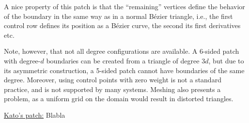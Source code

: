 \documentclass{article}
\begin{document}
A nice property of this patch is that the ``remaining'' vertices define the behavior of the
boundary in the same way as in a normal B\'ezier triangle, i.e., the first control row defines
its position as a B\'ezier curve, the second its first derivatives etc.

Note, however, that not all degree configurations are available. A 6-sided patch with degree-$d$
boundaries can be created from a triangle of degree $3d$, but due to its asymmetric construction,
a 5-sided patch cannot have boundaries of the same degree. Moreover, using control points with zero
weight is not a standard practice, and is not supported by many systems. Meshing
also presents a problem, as a uniform grid on the domain would result in distorted triangles.


\vspace{10pt}
\noindent\underline{Kato's patch:}\vspace{0.2em}\newline
Blabla
\end{document}
